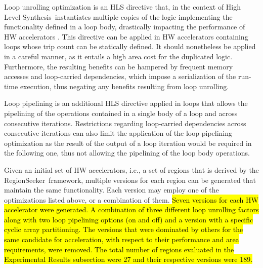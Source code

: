 \documentclass[]{usiinfthesis}
\newcommand{\rseeker}{{RegionSeeker}}
\newcommand{\HLS}{{High Level Synthesis}}
\begin{document}
Loop unrolling optimization is an HLS directive that, in the context of \HLS\, instantiates multiple 
copies of the logic implementing the functionality defined in a loop body, drastically impacting the 
performance of HW accelerators \cite{KulkarniOct12} \cite{KurraApr07}. This directive can be applied in HW
accelerators containing loops whose trip count can be statically defined. It should nonetheless
be applied in a careful manner, as it entails a high area cost for the duplicated logic. Furthermore,
the resulting benefits can be hampered by frequent memory accesses and loop-carried dependencies, which 
impose a serialization of the run-time execution, thus negating any benefits resulting from loop unrolling.\par

Loop pipelining is an additional HLS directive applied in loops that allows the pipelining of 
the operations contained in a single body of a loop and across consecutive iterations. Restrictions 
regarding loop-carried dependencies across consecutive iterations can also limit the application of the loop
pipelining optimization as the result of the output of a loop iteration would be required in the following
one, thus not allowing the pipelining of the loop body operations.\par

Given an initial set of HW accelerators, i.e., a set of regions that is derived by the \rseeker\ framework, 
multiple versions for each region can be generated that maintain the same functionality.
Each version may employ one of the optimizations listed above, or a combination of them. 
\hl{
Seven versions for each HW accelerator were generated. A combination of three different loop unrolling
factors along with two loop pipelining options (on and off) and a version with a specific cyclic array 
partitioning. The versions that were dominated by others for the same candidate for acceleration, with 
respect to their performance and area requirements, were removed. The total number of regions evaluated 
in the Experimental Results subsection were 27 and their respective versions were 189.
}
\par
\end{document}
